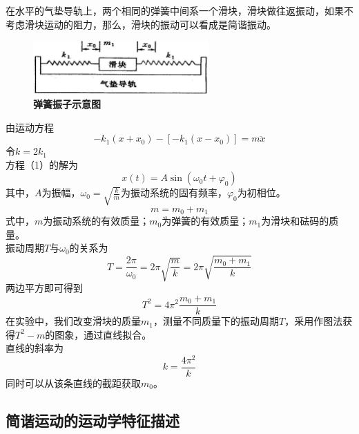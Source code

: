 \documentclass[UTF8]{article}
\theoremstyle{MyLineTheoremStyle} %
\theoremstyle{MyBlockTheoremStyle} %
\theoremstyle{MySubsubsectionStyle} %
\begin{document}
在水平的气垫导轨上，两个相同的弹簧中间系一个滑块，滑块做往返振动，如果不考虑滑块运动的阻力，那么，滑块的振动可以看成是简谐振动。
\begin{figure}[H]
    \centering
    \includegraphics[width=0.6\textwidth]{1.png}
    \caption{\bfseries 弹簧振子示意图}
    \label{fig1}
\end{figure}
由运动方程
\begin{equation}
    -k_{1}(x+x_{0})-[-k_{1}(x-x_{0})]=m\ddot{x}
\end{equation}
令$k=2k_1$\\
方程（1）的解为
\begin{equation}
    x(t)=A\sin(\omega_{0} t+\varphi_{0})
\end{equation}
其中，$A$为振幅，$\omega_{0}=\sqrt{\frac{k}{m}}$为振动系统的固有频率，$\varphi_{0}$为初相位。\\
\begin{equation}
    m=m_{0}+m_{1}
\end{equation}
式中，$m$为振动系统的有效质量；$m_{0}$为弹簧的有效质量；$m_{1}$为滑块和砝码的质量。\\
振动周期$T$与$\omega_{0}$的关系为
\begin{equation}
    T=\frac{2\pi}{\omega_{0}}=2\pi\sqrt{\frac{m}{k}}=2\pi\sqrt{\frac{m_{0}+m_{1}}{k}}
\end{equation}
两边平方即可得到
\begin{equation}
    T^{2}=4\pi^{2}\frac{m_{0}+m_{1}}{k}
\end{equation}
在实验中，我们改变滑块的质量$m_{1}$，测量不同质量下的振动周期$T$，采用作图法获得$T^{2}-m$的图象，通过直线拟合。\\
直线的斜率为
\begin{equation}
    k=\frac{4\pi^{2}}{k}
\end{equation}
同时可以从该条直线的截距获取$m_{0}$。\\








\subsection{简谐运动的运动学特征描述}
\end{document}
